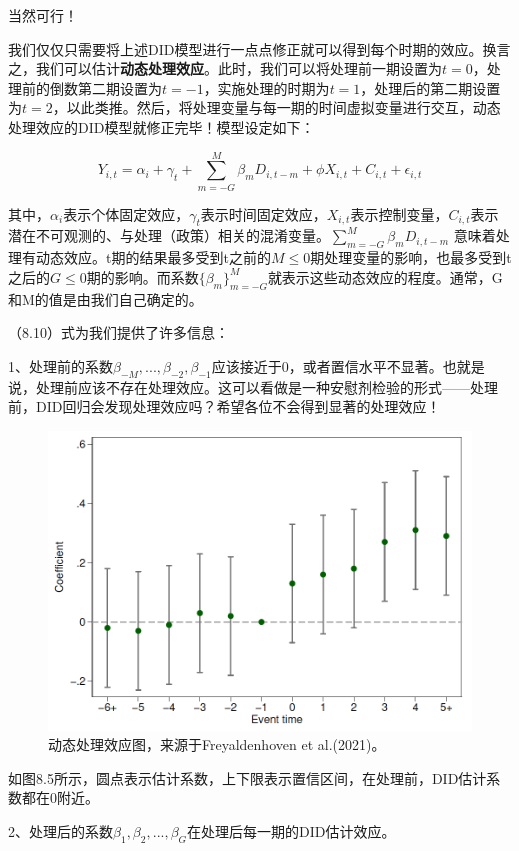 \documentclass[cn,12pt,math=newtx,citestyle=gb7714-2015,bibstyle=gb7714-2015]{elegantbook}
\begin{document}
	当然可行！
	
	我们仅仅只需要将上述DID模型进行一点点修正就可以得到每个时期的效应。换言之，我们可以估计\textbf{动态处理效应}。此时，我们可以将处理前一期设置为$t=0$，处理前的倒数第二期设置为$t=-1$，实施处理的时期为$t=1$，处理后的第二期设置为$t=2$，以此类推。然后，将处理变量与每一期的时间虚拟变量进行交互，动态处理效应的DID模型就修正完毕！模型设定如下：
	
	\begin{equation}
		Y_{i,t} = \alpha_i + \gamma_t + \sum_{m = -G}^{M} \beta_m D_{i,t-m} + \phi X_{i,t} + C_{i,t} + \epsilon_{i,t}
	\end{equation}
	
	其中，$\alpha_i$表示个体固定效应，$\gamma_t$表示时间固定效应，$X_{i,t}$表示控制变量，$C_{i,t}$表示潜在不可观测的、与处理（政策）相关的混淆变量。$ \sum_{m = -G}^{M} \beta_m D_{i,t-m} $ 意味着处理有动态效应。t期的结果最多受到t之前的$M \le 0 $期处理变量的影响，也最多受到t之后的$G \le 0$期的影响。而系数$\{\beta_m\}_{m=-G}^{M}$就表示这些动态效应的程度。通常，G和M的值是由我们自己确定的。
	
	（8.10）式为我们提供了许多信息：
	
	1、处理前的系数$\beta_{-M},...,\beta_{-2},\beta_{-1}$应该接近于0，或者置信水平不显著。也就是说，处理前应该不存在处理效应。这可以看做是一种安慰剂检验的形式——处理前，DID回归会发现处理效应吗？希望各位不会得到显著的处理效应！
	
	\begin{figure}[tbph]
		\centering
		\includegraphics[width=0.7\linewidth]{dynamicDID}
		\caption{动态处理效应图，来源于Freyaldenhoven et al.(2021)。}
		\label{fig:dynamicdid}
	\end{figure}
	
	如图8.5所示，圆点表示估计系数，上下限表示置信区间，在处理前，DID估计系数都在0附近。
	
	
	2、处理后的系数$\beta_{1},\beta_{2},...,\beta_{G}$在处理后每一期的DID估计效应。
	
\end{document}
